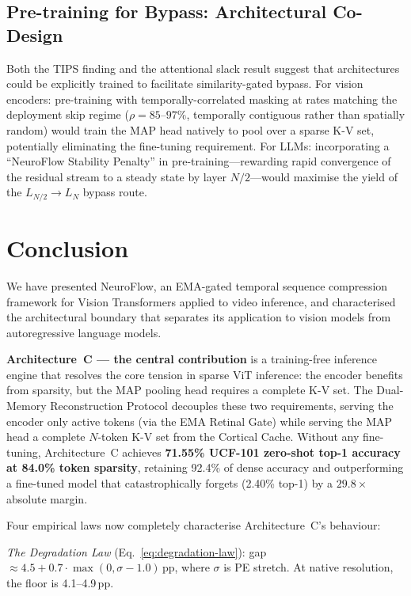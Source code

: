 \documentclass{article}
\begin{document}
\subsection{Pre-training for Bypass: Architectural Co-Design}
\label{sec:fw-pretraining-bypass}

Both the TIPS finding and the attentional slack result suggest that
architectures could be explicitly trained to facilitate similarity-gated
bypass. For vision encoders: pre-training with temporally-correlated
masking at rates matching the deployment skip regime ($\rho = 85$--$97\%$,
temporally contiguous rather than spatially random) would train the MAP head
natively to pool over a sparse K-V set, potentially eliminating the
fine-tuning requirement. For LLMs: incorporating a ``NeuroFlow Stability
Penalty'' in pre-training---rewarding rapid convergence of the residual
stream to a steady state by layer $N/2$---would maximise the yield of the
$L_{N/2} \to L_N$ bypass route.

\section{Conclusion}\label{conclusion}

We have presented NeuroFlow, an EMA-gated temporal sequence compression
framework for Vision Transformers applied to video inference, and
characterised the architectural boundary that separates its application
to vision models from autoregressive language models.

\textbf{Architecture~C --- the central contribution} is a training-free
inference engine that resolves the core tension in sparse ViT inference:
the encoder benefits from sparsity, but the MAP pooling head requires a
complete K-V set. The Dual-Memory Reconstruction Protocol decouples these
two requirements, serving the encoder only active tokens (via the EMA
Retinal Gate) while serving the MAP head a complete $N$-token K-V set
from the Cortical Cache. Without any fine-tuning, Architecture~C achieves
\textbf{71.55\% UCF-101 zero-shot top-1 accuracy at 84.0\% token
sparsity}, retaining 92.4\% of dense accuracy and outperforming a
fine-tuned model that catastrophically forgets (2.40\% top-1) by a
$29.8\times$ absolute margin.

Four empirical laws now completely characterise Architecture~C's behaviour:

\textit{The Degradation Law} (Eq.~\ref{eq:degradation-law}): gap $\approx
4.5 + 0.7 \cdot \max(0, \sigma - 1.0)$\,pp, where $\sigma$ is PE stretch.
At native resolution, the floor is 4.1--4.9\,pp.
\end{document}
